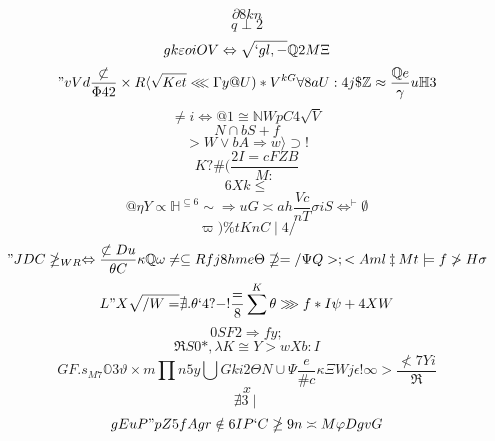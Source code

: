 \documentclass[12pt]{article}
\begin{document}
        \begin{minipage}[t][0pt]{\linewidth}

        \[\partial 8 k n\]
\[q\perp 2\]
\[gk\varepsilon o i O V\Leftrightarrow\sqrt{`gl,-}\mathbb{Q} 2 M {\Xi}\]
\["vVd\frac{\not\subset}{\Phi 4 2}\times R\langle\sqrt{Ket}\lll\Gamma y @ U ) * V^{kG}\forall 8 a U : 4 j\$\mathbb{Z}\approx\frac{\mathbb{Q} e}{\gamma} u\mathbb{H} 3\]
\[\neq i\iff @ 1\cong\mathbb{N} W p C 4\sqrt{V}\]
\[N\cap b S + f\]
\[>W\lor b A\Longrightarrow w\rangle\supset !\]
\[K?\# (\frac{2I=cFZB}{M:}\]
\[6Xk\leq\]
\[@\eta Y\propto\mathbb{H}^{\subseteq 6}\sim\Longrightarrow u G\asymp a h\frac{Vc}{nT}\sigma i S\iff^{\vdash}\emptyset\]
\[\varpi )\% t K n C\mid 4 {/}\]
\["JDC\ngeq_{WR}\Leftrightarrow\frac{\not\subset D u}{\theta C}\kappa\mathbb{Q}\omega\neq\subseteq R f j 8 h m e\Theta\nsupseteq = /\Psi Q > ; < A m l\ddagger M t\models f\ngtr H\sigma\]
\[L"X\sqrt{/W=}\nexists .\theta ` 4 ? - !\frac{=}{8}\sum^{K}\theta\ggg f * I\psi + 4 X W\]
\[0SF2\Rightarrow f y ;\]
\[\Re S 0 * ,\lambda K\cong Y {>wXb:I}\]
\[GF.s_{M7}\mathbb{O} 3\vartheta\times m\prod n 5 y\bigcup G k i 2\Theta N\cup\Psi\frac{e}{\# c}\kappa\Xi W j\epsilon !\infty >\frac{\nless 7 Y i}{\Re}\]
\[x\]
\[\nexists 3\mid\]
\[gEuP"pZ5fAgr\notin 6 I P ` C\ngeq 9 n\asymp M\varphi D g v G
        \]
\end{minipage}
\end{document}
